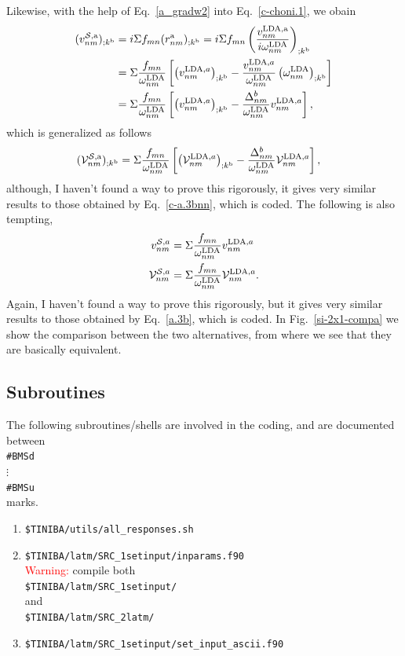 Likewise, with the help
of Eq.~\eqref{a_gradw2} into
Eq.~\eqref{c-choni.1}, we obain
\begin{align}\label{ccu54}
(v^{{\cal S},\mathrm{a}}_{nm})_{;k^{\mathrm{b}}}&=
i\Sigma f_{mn}(r^{\mathrm{a}}_{nm})_{;k^{\mathrm{b}}}
=
i\Sigma f_{mn}\left(\frac{v^{\mathrm{LDA},\mathrm{a}}_{nm}}{i\omega^{\mathrm{LDA}}_{nm}}\right)_{;k^{\mathrm{b}}}
\nonumber\\
&=
\Sigma\frac{f_{mn}}{\omega^{\mathrm{LDA}}_{nm}}\left[
\left(v^{\mathrm{LDA},a}_{nm}\right)_{;k^{\mathrm{b}}}
-
\frac{v^{\mathrm{LDA},a}_{nm}}{\omega^{\mathrm{LDA}}_{nm}}\left(\omega^{\mathrm{LDA}}_{nm}\right)_{;k^{\mathrm{b}}}
\right]
\nonumber\\
&=
\Sigma\frac{f_{mn}}{\omega^{\mathrm{LDA}}_{nm}}\left[
\left(v^{\mathrm{LDA},a}_{nm}\right)_{;k^{\mathrm{b}}}
-
\frac{\Delta^{b}_{nm}}{\omega^{\mathrm{LDA}}_{nm}}v^{\mathrm{LDA},a}_{nm}
\right]
,
\end{align}
which is generalized as follows 
\begin{align}\label{ccu55}
({\mathbf{\cal V}}^{{\cal S},\mathrm{a}}_{nm})_{;k^{\mathrm{b}}}&=
\Sigma\frac{f_{mn}}{\omega^{\mathrm{LDA}}_{nm}}\left[
\left({\mathbf{\cal V}}^{\mathrm{LDA},a}_{nm}\right)_{;k^{\mathrm{b}}}
-
\frac{\Delta^{b}_{nm}}{\omega^{\mathrm{LDA}}_{nm}}{\mathbf{\cal V}}^{\mathrm{LDA},a}_{nm}
\right]
,
\end{align}
although, I haven't found a way to prove this rigorously, it gives 
very similar results to those obtained by Eq.~\eqref{c-a.3bnn}, which 
is coded. 
The following is also tempting,
\begin{align}\label{temp.1}
v^{{\cal S},a}_{nm}
&=\Sigma\frac{f_{mn}}{\omega^{\mathrm{LDA}}_{nm}}
v^{\mathrm{LDA},a}_{nm}
\nonumber\\
{\mathbf{\cal V}}^{{\cal S},a}_{nm}
&=\Sigma\frac{f_{mn}}{\omega^{\mathrm{LDA}}_{nm}}
{\mathbf{\cal V}}^{\mathrm{LDA},a}_{nm}
.
\end{align}
Again, I haven't found a way to prove this rigorously, but it gives 
very similar results to those obtained by Eq.~\eqref{a.3b}, which 
is coded. In Fig.~\ref{si-2x1-compa} we show the comparison between
the two alternatives, from where we see that they are basically equivalent. 



\subsection{Subroutines}

The following subroutines/shells are involved in the coding,
and are documented between\\
\verb=#BMSd=\\
$\vdots$\\
\verb=#BMSu=\\
marks.
\begin{enumerate}
\item \verb=$TINIBA/utils/all_responses.sh=
\item \verb=$TINIBA/latm/SRC_1setinput/inparams.f90=\\
\textcolor{red}{Warning:} compile both\\
\verb=$TINIBA/latm/SRC_1setinput/= \\
and\\
\verb=$TINIBA/latm/SRC_2latm/= 
\item \verb=$TINIBA/latm/SRC_1setinput/set_input_ascii.f90=\\
\end{enumerate}

